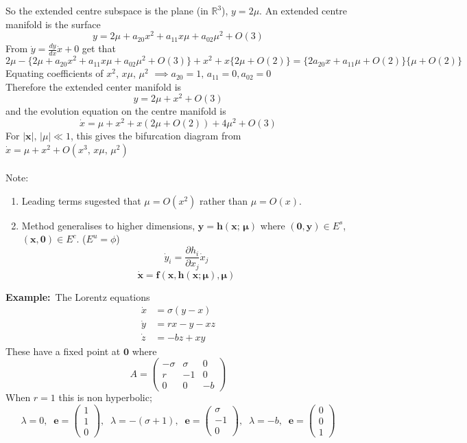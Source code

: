 \documentclass{article}
\newcommand{\example}{\textbf{Example:}}                    %
\newcommand{\bx}{\bm{x}}                                    %
\newcommand{\pder}[2] {\frac{\partial {#1}}{\partial {#2} }}%
\begin{document}
So the extended centre subspace is the plane (in $\mathbb{R}^3$),
$y = 2 \mu$.
An extended centre manifold is the surface
\[ y = 2\mu + a_{20}x^2 + a_{11}x\mu + a_{02}\mu^2 + O(3) \]
From $\displaystyle \dot{y} = \frac{dy}{dx}\dot{x} +0$ get that
\[ 2\mu - \{2\mu + a_{20}x^2 + a_{11}x\mu + a_{02}\mu^2 + O(3)\} + x^2+x\{2\mu +O(2)\}
= \{2a_{20}x + a_{11} \mu +O(2)\}\{\mu + O(2)\}  \]
Equating coefficients of $x^2, \, x\mu , \, \mu^2$ $\implies a_{20} =1, \, 
a_{11} =0, a_{02}=0$
\\
Therefore the extended center manifold is 
\[ y = 2\mu + x^2 +O(3) \]
and the evolution equation on the centre manifold is
\[ \dot{x} = \mu + x^2 + x(2\mu +O(2)) + 4\mu^2 + O(3) \]
For $|\bx| , \, |\mu| \ll 1$, this gives the bifurcation diagram from
$\dot{x} = \mu + x^2 + O(x^3,\, x\mu, \, \mu^2)$
\\
\\
Note:
\begin{enumerate}[1.]
\item Leading terms sugested that $\mu = O(x^2)$ rather than $\mu = O(x)$.
\item Method generalises to higher dimensions,
$\bm{y} = \bm{h}(\bx; \, \bm{\mu})$ where $(\bm{0},\bm{y})\in E^s$, 
$(\bx,\bm{0}) \in E^c$. ($E^u = \phi$)
\[ \dot{y}_i = \pder{h_i}{x_j} \dot{x}_j \]
\[ \dot{\bx} = \bm{f}(\bx, \bm{h}(\bx;\bm{\mu}), \bm{\mu})\]
\end{enumerate}
\noindent \example\ The Lorentz equations
\begin{align*}
\dot{x} &= \sigma(y-x) \\
\dot{y} &= rx - y - xz \\
\dot{z} &= -bz + xy
\end{align*}
These have a fixed point at $\bm{0}$ where
\[ A = \left( \begin{array}{rrr}
-\sigma & \sigma & 0 \\
r & -1 & 0 \\
0 & 0 & -b
\end{array} \right) \]
When $r=1$ this is non hyperbolic;
\[ \lambda=0, \;\;
\bm{e} = \left( \begin{array}{c} 1 \\ 1 \\ 0 \end{array} \right), \;\;
\lambda = -(\sigma +1), \; \;
\bm{e} = \left( \begin{array}{r} \sigma \\ -1 \\ 0 \end{array} \right), \;\;
\lambda = -b, \; \;
\bm{e} = \left( \begin{array}{c} 0 \\ 0 \\ 1 \end{array} \right) \]
\end{document}
